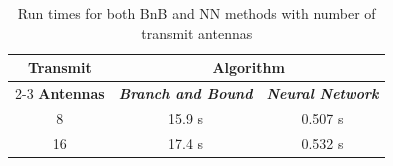 \documentclass[conference]{IEEEtran}
\begin{document}

\begin{table}[htbp]
\caption{Run times for both BnB and NN methods with number of transmit antennas}
\begin{center}
\begin{tabular}{|c|c|c|}
\hline
\textbf{Transmit}&\multicolumn{2}{|c|}{\textbf{Algorithm}} \\
\cline{2-3} 
\textbf{Antennas} & \textbf{\textit{Branch and Bound}}& \textbf{\textit{Neural Network}} \\
\hline
8 & 15.9 s & 0.507 s  \\
\hline
16 & 17.4 s & 0.532 s  \\
\hline
\end{tabular}
\label{tab:1}
\end{center}
\end{table}
\end{document}
